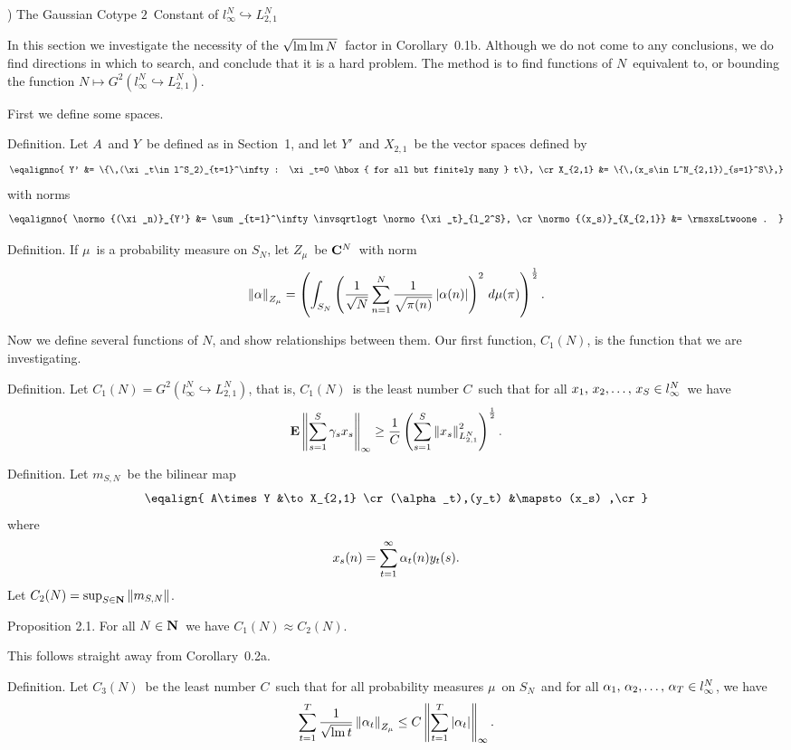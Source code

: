 ) The Gaussian Cotype $2$\ Constant of $l_\infty^N
\hookrightarrow L^N_{2,1}$
 
In this section we investigate the necessity of the $\sqrt{\mathop{\rm lm}\nolimits\mathop{\rm lm}\nolimits
N}$\ factor
in Corollary~0.1b. Although we do not come to any conclusions, we
do find
directions in which to search, and conclude that it is a hard problem.
The
method is to find functions of $N$\ equivalent to, or bounding the
function
$N \mapsto G^2( l_\infty^N \hookrightarrow L_{2,1}^N)$.
 
First we define some spaces.
 
\proclaim Definition. Let $A$\ and $Y$\ be defined as in Section~1,
and let
$Y'$\ and $X_{2,1}$\ be the vector spaces defined by
$$ \eqalignno{
   Y' &= \{\,(\xi_t\in l^S_2)_{t=1}^\infty:
   \xi_t=0 \hbox{ for all but finitely many } t\}, \cr
   X_{2,1} &= \{\,(x_s\in L^N_{2,1})_{s=1}^S\},}$$
with norms
$$\eqalignno{
  \normo{(\xi_n)}_{Y'} &=
  \sum_{t=1}^\infty \invsqrtlogt \normo{\xi_t}_{l_2^S}, \cr
  \normo{(x_s)}_{X_{2,1}} &=
  \rmsxsLtwoone . }$$
 
\proclaim Definition. If $\mu$\ is a probability measure on $S_N$,
let
$Z_\mu$\ be\/ ${\bf C}^N$\ with norm
$$ \left\| \alpha \right\|_{Z_\mu} =
   \left( \int_{S_N} \left( {1\over\sqrt{N}} \sum_{n=1}^N {1\over\sqrt{\pi(n)}} \left|\alpha(n)\right|
   \right)^2 \,d\mu(\pi) \right)^{1\over2} .$$
 
Now we define several functions of $N$, and show relationships between
them.
Our first function, $C_1(N)$, is the function that we are investigating.
 
\proclaim Definition. Let $C_1(N) = G^2( l_\infty^N \hookrightarrow
L_{2,1}^N
)$, that is, $C_1(N)$\ is the least number $C$\ such that for all
$\xS\in
l_\infty^N$\ we have
$$ {\bf E} \left\| \sum_{s=1}^S \gamma_s x_s \right\|_\infty \ge {1\over C} \left( \sum_{s=1}^S \left\| x_s \right\|_{L_{2,1}^N}^2 \right)^{1\over2} .$$
 
\proclaim Definition. Let $m_{S,N}$\ be the bilinear map
$$ \eqalign{
   A\times Y        &\to     X_{2,1} \cr
   (\alpha_t),(y_t) &\mapsto (x_s) ,\cr}$$
where
$$ x_s(n) = \sum_{t=1}^\infty \alpha_t(n) y_t(s) .$$
Let $C_2(N) = \sup_{S\in{\bf N}} \left\| m_{S,N} \right\|$.
 
\proclaim Proposition 2.1. For all $N\in{\bf N}$\ we have $C_1(N) \approx
C_2(N)$.
 
\Proof This follows straight away from Corollary~0.2a.
\endproof
 
\proclaim Definition. Let $C_3(N)$\ be the least number $C$\ such
that for all
probability measures $\mu$\ on $S_N$\ and for all $\alphaT\in l_\infty^N$,
we
have
$$ \sum_{t=1}^T {1\over\sqrt{\mathop{\rm lm}\nolimits t}} \left\| \alpha_t \right\|_{Z_\mu}
   \le C \left\| \sum_{t=1}^T \left|\alpha_t\right| \right\|_\infty .$$
 
